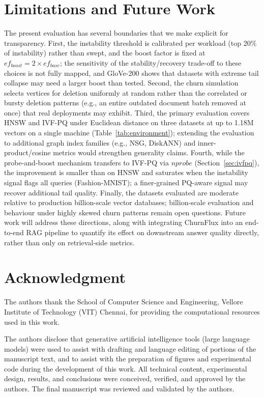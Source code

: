 \documentclass{ieeeaccess}
\begin{document}
\section{Limitations and Future Work}
\label{sec:limitations}
The present evaluation has several boundaries that we make explicit for transparency. First, the instability threshold is calibrated per workload (top 20\% of instability) rather than swept, and the boost factor is fixed at $ef_{boost}=2\times ef_{base}$; the sensitivity of the stability/recovery trade-off to these choices is not fully mapped, and GloVe-200 shows that datasets with extreme tail collapse may need a larger boost than tested. Second, the churn simulation selects vertices for deletion uniformly at random rather than the correlated or bursty deletion patterns (e.g., an entire outdated document batch removed at once) that real deployments may exhibit. Third, the primary evaluation covers HNSW and IVF-PQ under Euclidean distance on three datasets at up to 1.18M vectors on a single machine (Table~\ref{tab:environment}); extending the evaluation to additional graph index families (e.g., NSG, DiskANN) and inner-product/cosine metrics would strengthen generality claims. Fourth, while the probe-and-boost mechanism transfers to IVF-PQ via $nprobe$ (Section~\ref{sec:ivfpq}), the improvement is smaller than on HNSW and saturates when the instability signal flags all queries (Fashion-MNIST); a finer-grained PQ-aware signal may recover additional tail quality. Finally, the datasets evaluated are moderate relative to production billion-scale vector databases; billion-scale evaluation and behaviour under highly skewed churn patterns remain open questions. Future work will address these directions, along with integrating ChurnFlux into an end-to-end RAG pipeline to quantify its effect on downstream answer quality directly, rather than only on retrieval-side metrics.

\section*{Acknowledgment}
The authors thank the School of Computer Science and Engineering, Vellore Institute of Technology (VIT) Chennai, for providing the computational resources used in this work.

The authors disclose that generative artificial intelligence tools (large language models) were used to assist with drafting and language editing of portions of the manuscript text, and to assist with the preparation of figures and experimental code during the development of this work. All technical content, experimental design, results, and conclusions were conceived, verified, and approved by the authors. The final manuscript was reviewed and validated by the authors.
\end{document}
